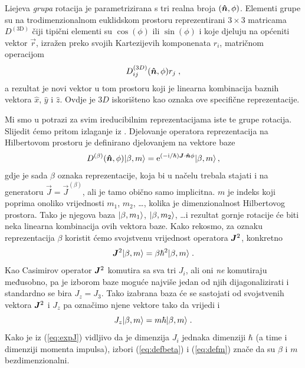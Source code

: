 Liejeva \emph{grupa} rotacija je parametrizirana s tri realna broja $(\unitn, \phi)$.
Elementi grupe su na trodimenzionalnom euklidskom prostoru reprezentirani $3\times 3$
matricama $D^{(\mathrm{3D})}$
čiji tipični elementi su $\cos(\phi)$ ili $\sin(\phi)$ i koje djeluju
na općeniti vektor $\vec{r}$, izražen preko svojih Kartezijevih komponenata $r_i$,
matričnom operacijom
\begin{displaymath}
   D^{(3D)}_{ij}(\unitn, \phi) r_j  \;,
\end{displaymath}
a rezultat je novi vektor u tom prostoru koji je linearna kombinacija
baznih vektora $\hat{x}$, $\hat{y}$ i $\hat{z}$.
Ovdje je $3D$ iskorišteno kao oznaka ove specifične reprezentacije.

Mi smo u potrazi za svim ireducibilnim reprezentacijama iste te grupe rotacija.
Slijedit ćemo pritom izlaganje iz \cite{Sakurai:2011}. 
Djelovanje operatora reprezentacija na Hilbertovom prostoru je definirano
djelovanjem na vektore baze
\begin{equation}
   D^{(\beta)}(\unitn,\phi) \ket{\beta, m} =
 \rme^{(-\rmi/\hbar)\vec{J}\cdot\unitn\phi}\ket{\beta, m} \,,
 \label{eq:Drot}
\end{equation}
gdje je sada $\beta$ oznaka reprezentacije, koja bi u načelu trebala
stajati i na generatoru $\vec{J} = \vec{J}^{(\beta)}$, ali je tamo obično samo implicitna.
$ m $ je indeks koji poprima onoliko vrijednosti $m_1$, $m_2$, \ldots, kolika je dimenzionalnost
Hilbertovog prostora. Tako je njegova baza
$| \beta, m_1 \rangle$, $| \beta, m_2 \rangle$, \ldots i rezultat gornje rotacije će
biti neka linearna kombinacija ovih vektora baze. Kako rekosmo, za oznaku 
reprezentacija $\beta$ koristit ćemo svojstvenu vrijednost operatora $\jsq$,
konkretno
\begin{equation}
  \jsq \ket{\beta, m} = \beta \hbar^2 \ket{\beta, m} \;.
  \label{eq:defbeta}
\end{equation}
Kao Casimirov operator $\jsq$ komutira sa sva tri $J_i$, ali oni \emph{ne}
komutiraju međusobno, pa je izborom baze moguće najviše jedan od njih
dijagonalizirati i standardno se bira $J_{z} = J_{3}$. Tako izabrana baza
će se sastojati od svojstvenih vektora $\jsq$ i $J_z$ pa označimo 
njene vektore tako da vrijedi i
\begin{equation}
  J_z | \beta, m \rangle = m \hbar | \beta, m \rangle \;.
  \label{eq:defm}
\end{equation}
Kako je iz (\ref{eq:expJ}) vidljivo da je dimenzija $J_i$ jednaka
dimenziji $\hbar$ (a time i dimenziji momenta impulsa), izbori
(\ref{eq:defbeta})  i (\ref{eq:defm}) znače da su $\beta$ i $m$
bezdimenzionalni. 


